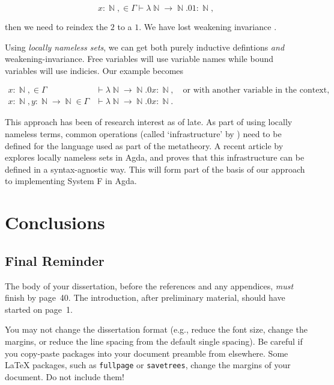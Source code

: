 \documentclass[logo,bsc,singlespacing,parskip,online]{infthesis}
\DeclareMathOperator{\nat}{\mathbb{N}}
\begin{document}
\begin{equation*}
  x \colon \nat, \in \Gamma \vdash \lambda \nat \to \nat. 0 1 \colon \nat,
\end{equation*}

then we need to reindex the $2$ to a $1$. We have lost weakening invariance \citep{aydemir_engineering_2008}.

Using \textit{locally nameless sets}, we can get both purely inductive defintions \textit{and} weakening-invariance. Free variables will use variable names while bound variables will use indicies. Our example becomes

\begin{align*}
  x \colon \nat, \in \Gamma &\vdash \lambda \nat \to \nat. 0 x \colon \nat,\quad \text{or with another variable in the context,}\\
  x \colon \nat, y \colon \nat \to \nat \in \Gamma &\vdash \lambda \nat \to \nat. 0 x \colon \nat.
\end{align*}

This approach has been of research interest as of late. As part of using locally nameless terms, common operations (called `infrastructure' by \citet{aydemir_engineering_2008}) need to be defined for the language used as part of the metatheory. A recent article by \citet{pitts_locally_2023} explores locally nameless sets in Agda, and proves that this infrastructure can be defined in a syntax-agnostic way. This will form part of the basis of our approach to implementing System F in Agda.

\chapter{Conclusions}

\section{Final Reminder}

The body of your dissertation, before the references and any appendices,
\emph{must} finish by page~40. The introduction, after preliminary material,
should have started on page~1.

You may not change the dissertation format (e.g., reduce the font size, change
the margins, or reduce the line spacing from the default single spacing). Be
careful if you copy-paste packages into your document preamble from elsewhere.
Some \LaTeX{} packages, such as \texttt{fullpage} or \texttt{savetrees}, change
the margins of your document. Do not include them!
\end{document}
